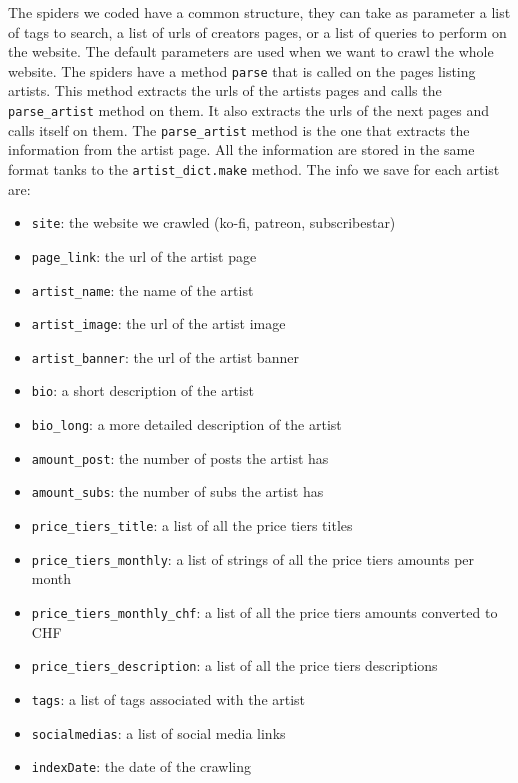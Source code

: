 \documentclass[tikz,14pt]{article}
\begin{document}
The spiders we coded have a common structure, they can take as parameter a list of tags to search, 
a list of urls of creators pages, or a list of queries to perform on the website.
The default parameters are used when we want to crawl the whole website.
The spiders have a method \texttt{parse} that is called on the pages listing artists.
This method extracts the urls of the artists pages and calls the \texttt{parse_artist} method on them.
It also extracts the urls of the next pages and calls itself on them.
The \texttt{parse_artist} method is the one that extracts the information from the artist page.
All the information are stored in the same format tanks to the \texttt{artist_dict.make} method.
The info we save for each artist are:
\begin{itemize}
    \item \texttt{site}: the website we crawled (ko-fi, patreon, subscribestar)
    \item \texttt{page_link}: the url of the artist page
    \item \texttt{artist_name}: the name of the artist
    \item \texttt{artist_image}: the url of the artist image
    \item \texttt{artist_banner}: the url of the artist banner
    \item \texttt{bio}: a short description of the artist
    \item \texttt{bio_long}: a more detailed description of the artist
    \item \texttt{amount_post}: the number of posts the artist has
    \item \texttt{amount_subs}: the number of subs the artist has
    \item \texttt{price_tiers_title}: a list of all the price tiers titles
    \item \texttt{price_tiers_monthly}: a list of strings of all the price tiers amounts per month
    \item \texttt{price_tiers_monthly_chf}: a list of all the price tiers amounts converted to CHF
    \item \texttt{price_tiers_description}: a list of all the price tiers descriptions
    \item \texttt{tags}: a list of tags associated with the artist
    \item \texttt{socialmedias}: a list of social media links
    \item \texttt{indexDate}: the date of the crawling
\end{itemize}
\end{document}
